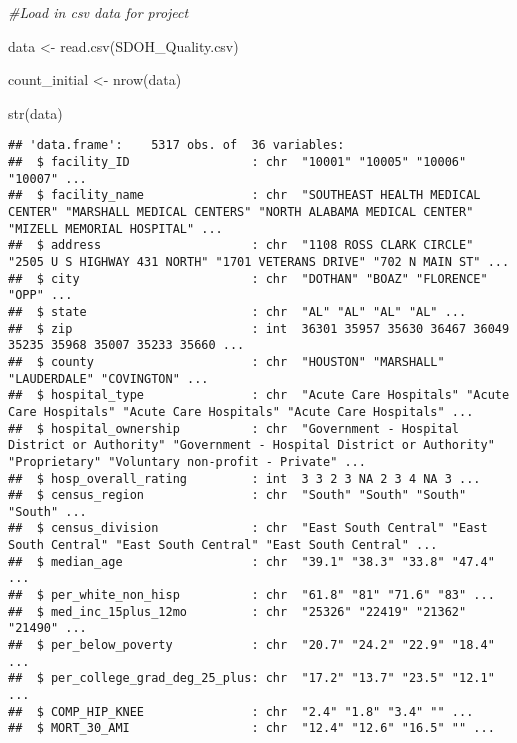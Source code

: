 \documentclass[
]{article}
\newenvironment{Shaded}{\begin{snugshade}}{\end{snugshade}}
\newcommand{\CommentTok}[1]{\textcolor[rgb]{0.56,0.35,0.01}{\textit{#1}}}
\newcommand{\FunctionTok}[1]{\textcolor[rgb]{0.00,0.00,0.00}{#1}}
\newcommand{\NormalTok}[1]{#1}
\newcommand{\OtherTok}[1]{\textcolor[rgb]{0.56,0.35,0.01}{#1}}
\newcommand{\StringTok}[1]{\textcolor[rgb]{0.31,0.60,0.02}{#1}}
\begin{document}
\begin{Shaded}
\begin{Highlighting}[]
\CommentTok{\#Load in csv data for project}

\NormalTok{data }\OtherTok{\textless{}{-}} \FunctionTok{read.csv}\NormalTok{(}\StringTok{\textquotesingle{}SDOH\_Quality.csv\textquotesingle{}}\NormalTok{)}

\NormalTok{count\_initial }\OtherTok{\textless{}{-}} \FunctionTok{nrow}\NormalTok{(data)}

\FunctionTok{str}\NormalTok{(data)}
\end{Highlighting}
\end{Shaded}

\begin{verbatim}
## 'data.frame':    5317 obs. of  36 variables:
##  $ facility_ID                 : chr  "10001" "10005" "10006" "10007" ...
##  $ facility_name               : chr  "SOUTHEAST HEALTH MEDICAL CENTER" "MARSHALL MEDICAL CENTERS" "NORTH ALABAMA MEDICAL CENTER" "MIZELL MEMORIAL HOSPITAL" ...
##  $ address                     : chr  "1108 ROSS CLARK CIRCLE" "2505 U S HIGHWAY 431 NORTH" "1701 VETERANS DRIVE" "702 N MAIN ST" ...
##  $ city                        : chr  "DOTHAN" "BOAZ" "FLORENCE" "OPP" ...
##  $ state                       : chr  "AL" "AL" "AL" "AL" ...
##  $ zip                         : int  36301 35957 35630 36467 36049 35235 35968 35007 35233 35660 ...
##  $ county                      : chr  "HOUSTON" "MARSHALL" "LAUDERDALE" "COVINGTON" ...
##  $ hospital_type               : chr  "Acute Care Hospitals" "Acute Care Hospitals" "Acute Care Hospitals" "Acute Care Hospitals" ...
##  $ hospital_ownership          : chr  "Government - Hospital District or Authority" "Government - Hospital District or Authority" "Proprietary" "Voluntary non-profit - Private" ...
##  $ hosp_overall_rating         : int  3 3 2 3 NA 2 3 4 NA 3 ...
##  $ census_region               : chr  "South" "South" "South" "South" ...
##  $ census_division             : chr  "East South Central" "East South Central" "East South Central" "East South Central" ...
##  $ median_age                  : chr  "39.1" "38.3" "33.8" "47.4" ...
##  $ per_white_non_hisp          : chr  "61.8" "81" "71.6" "83" ...
##  $ med_inc_15plus_12mo         : chr  "25326" "22419" "21362" "21490" ...
##  $ per_below_poverty           : chr  "20.7" "24.2" "22.9" "18.4" ...
##  $ per_college_grad_deg_25_plus: chr  "17.2" "13.7" "23.5" "12.1" ...
##  $ COMP_HIP_KNEE               : chr  "2.4" "1.8" "3.4" "" ...
##  $ MORT_30_AMI                 : chr  "12.4" "12.6" "16.5" "" ...

\end{verbatim}
\end{document}

